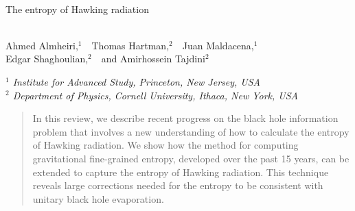 \documentclass[11pt,oneside,letterpaper]{article}
\numberwithin{equation}{section}
\begin{document}

\begin{center}

~
\vskip5mm

{\LARGE  {
The entropy of Hawking radiation  \\
\ \\
}}

\vskip10mm

Ahmed Almheiri,$^1$\ \ Thomas Hartman,$^{2}$\ \ Juan Maldacena,$^{1}$\\  Edgar Shaghoulian,$^{2}$\ \  and Amirhossein Tajdini$^{2}$

\vskip5mm

{\it $^1$ Institute for Advanced Study, Princeton, New Jersey, USA } \\
\vskip5mm
{\it $^2$ Department of Physics, Cornell University, Ithaca, New York, USA
} 

\vskip5mm

\end{center}

\vspace{4mm}

\begin{abstract}
\noindent
In this review, we describe recent progress on the black hole information problem that involves a new understanding of how to calculate the entropy of Hawking radiation. We show how the method for computing gravitational fine-grained entropy, developed over the past 15 years, can be extended to capture the entropy of Hawking radiation. This technique reveals large corrections needed for the entropy to be consistent with unitary black hole evaporation.



 
 
 \end{abstract}


\pagebreak
\pagestyle{plain}

\setcounter{tocdepth}{2}
{}
\vfill
\tableofcontents

\newpage
\end{document}
